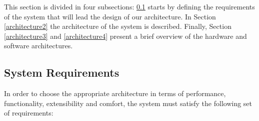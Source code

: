 This section is divided in four subsections: \ref{architecture1} starts by defining the requirements of the system that will lead the design of our architecture. In Section \ref{architecture2} the architecture of the system is described. Finally, Section \ref{architecture3} and \ref{architecture4} present a brief overview of the hardware and software architectures.




\subsection{System Requirements}\label{architecture1} 

In order to choose the appropriate architecture in terms of performance, functionality, extensibility and comfort, the system must satisfy the following set of requirements:

